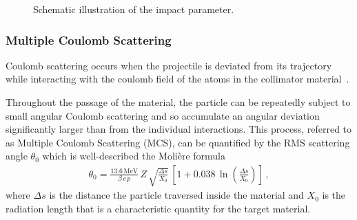  \begin{figure}[t]  
  \centering
  \caption{Schematic illustration of the impact parameter.}
  \label{pic:impact}
\end{figure}



\subsubsection{Multiple Coulomb Scattering}

Coulomb scattering occurs when the projectile is deviated from its trajectory while interacting with the coulomb field of the atoms in the collimator material~\cite{Beringer:1900zz}. 

Throughout the passage of the material, the particle can be repeatedly subject to small angular Coulomb scattering and so accumulate an angular deviation significantly larger than from the individual interactions. This process, referred to as Multiple Coulomb Scattering (MCS), can be quantified by the RMS scattering angle $\theta_0$ which is well-described the Moli\`{e}re formula~\cite{Beringer:1900zz}
\begin{align}
\theta_0 = \frac{13.6\,\text{MeV}}{\beta \, c \, p} \, Z \, \sqrt{\frac{\Delta s}{X_0}} \, \left[ 1 + 0.038 \, \ln \left( \frac{\Delta s}{X_0} \right) \right] \, ,
\end{align}
where $\Delta s$ is the distance the particle traversed inside the material and $X_0$ is the radiation length that is a characteristic quantity for the target material. 

